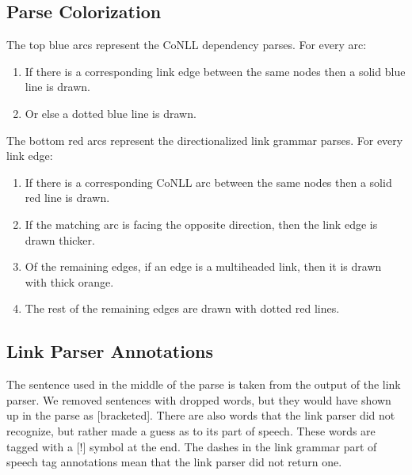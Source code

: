 \documentclass[11pt]{article}
\begin{document}
\subsection{Parse Colorization}
The top blue arcs represent the CoNLL dependency parses. For every arc:
\begin{enumerate}
\item If there is a corresponding link edge between the same nodes then a solid blue line is drawn.
\item Or else a dotted blue line is drawn. 
\end{enumerate}
The bottom red arcs represent the directionalized link grammar parses. For every link edge:
\begin{enumerate}
\item If there is a corresponding CoNLL arc between the same nodes then a solid red line is drawn.
\item If the matching arc is facing the opposite direction, then the link edge is drawn thicker.
\item Of the remaining edges, if an edge is a multiheaded link, then it is drawn with thick orange.
\item The rest of the remaining edges are drawn with dotted red lines.
\end{enumerate}

\subsection{Link Parser Annotations}
The sentence used in the middle of the parse is taken from the output of the link parser. We removed sentences with dropped words, but they would have shown up in the parse as [bracketed]. There are also words that the link parser did not recognize, but rather made a guess as to its part of speech. These words are tagged with a [!] symbol at the end. The dashes in the link grammar part of speech tag annotations mean that the link parser did not return one.

%
\end{document}
